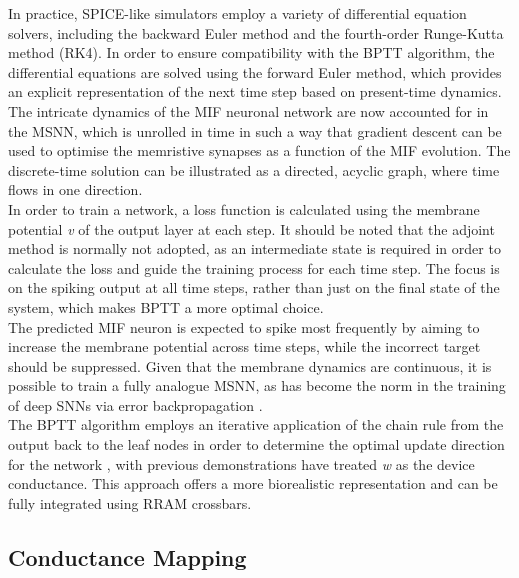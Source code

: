 \noindent In practice, SPICE-like simulators employ a variety of differential equation solvers, including the backward Euler method and the fourth-order Runge-Kutta method (RK4). In order to ensure compatibility with the BPTT algorithm, the differential equations are solved using the forward Euler method, which provides an explicit representation of the next time step based on present-time dynamics. \\

\noindent The intricate dynamics of the MIF neuronal network are now accounted for in the MSNN, which is unrolled in time in such a way that gradient descent can be used to optimise the memristive synapses as a function of the MIF evolution. The discrete-time solution can be illustrated as a directed, acyclic graph, where time flows in one direction. \\

\noindent In order to train a network, a loss function is calculated using the membrane potential \textit{v} of the output layer at each step. It should be noted that the adjoint method \cite{chen2018neural} is normally not adopted, as an intermediate state is required in order to calculate the loss and guide the training process for each time step. The focus is on the spiking output at all time steps, rather than just on the final state of the system, which makes BPTT a more optimal choice.\\

\noindent The predicted MIF neuron is expected to spike most frequently by aiming to increase the membrane potential across time steps, while the incorrect target should be suppressed. Given that the membrane dynamics are continuous, it is possible to train a fully analogue MSNN, as has become the norm in the training of deep SNNs via error backpropagation \cite{neftci2019surrogate}.\\

\noindent The BPTT algorithm employs an iterative application of the chain rule from the output back to the leaf nodes in order to determine the optimal update direction for the network \cite{eshraghian2023training}, with previous demonstrations have treated \textit{w} as the device conductance. This approach offers a more biorealistic representation and can be fully integrated using RRAM crossbars.

\subsection[Conductance Mapping]{Conductance Mapping}

